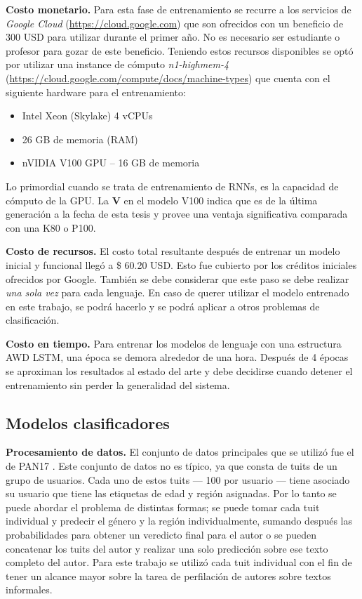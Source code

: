 \textbf{Costo monetario.} Para esta fase de entrenamiento se recurre a los servicios de \textit{Google Cloud} (\href{https://cloud.google.com/free}{https://cloud.google.com}) que son ofrecidos con un beneficio de 300 USD para utilizar durante el primer año. No es necesario ser estudiante o profesor para gozar de este beneficio. Teniendo estos recursos disponibles se optó por utilizar una instance de cómputo \emph{n1-highmem-4} (\url{https://cloud.google.com/compute/docs/machine-types}) que cuenta con	el siguiente hardware para el entrenamiento:


\begin{itemize}
\item Intel Xeon (Skylake) 4 vCPUs
\item 26 GB de memoria (RAM)
\item nVIDIA V100 GPU -- 16 GB de memoria
\end{itemize}

Lo primordial cuando se trata de entrenamiento de RNNs, es la capacidad de cómputo de la GPU. La \textbf{V} en el modelo V100 indica que es de la última generación a la fecha de esta tesis y provee una ventaja significativa comparada con una K80 o P100.

\textbf{Costo de recursos.} El costo total resultante después de entrenar un modelo inicial y funcional llegó a \$ 60.20 USD. Esto fue cubierto por los créditos iniciales ofrecidos por Google. También se debe considerar que este paso se debe realizar \emph{una sola vez} para cada lenguaje. En caso de querer utilizar el modelo entrenado en este trabajo, se podrá hacerlo y se podrá aplicar a otros problemas de clasificación.

\textbf{Costo en tiempo.} Para entrenar los modelos de lenguaje con una estructura AWD LSTM, una época se demora alrededor de una hora. Después de 4 épocas se aproximan los resultados al estado del arte y debe decidirse cuando detener el entrenamiento sin perder la generalidad del sistema.

\subsection{Modelos clasificadores}

\textbf{Procesamiento de datos.} El conjunto de datos principales que se utilizó fue el de PAN17 \parencite{rangel2017overview}. Este conjunto de datos no es típico, ya que consta de tuits de un grupo de usuarios. Cada uno de estos tuits --- 100 por usuario --- tiene asociado su usuario que tiene las etiquetas de edad y región asignadas. Por lo tanto se puede abordar el problema de distintas formas; se puede tomar cada tuit individual y predecir el género y la región individualmente, sumando después las probabilidades para obtener un veredicto final para el autor o se pueden concatenar los tuits del autor y realizar una solo predicción sobre ese texto completo del autor. Para este trabajo se utilizó cada tuit individual con el fin de tener un alcance mayor sobre la tarea de perfilación de autores sobre textos informales.

